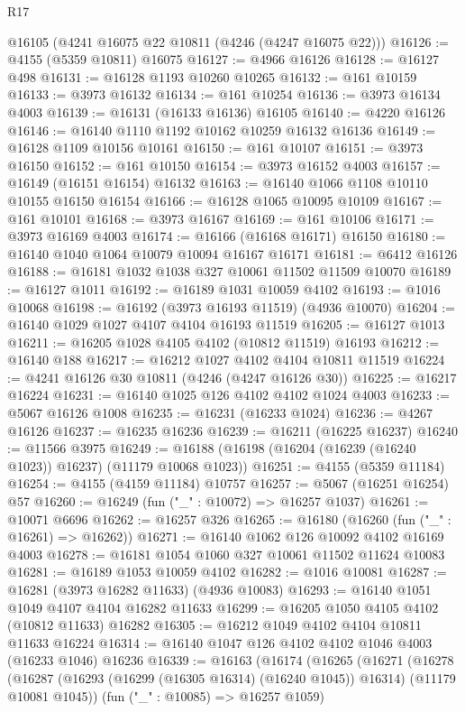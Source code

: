 \begin{lexlean}{R17}
\begin{coremodule}
    @16105
    (@4241 @16075 @22 @10811 (@4246 (@4247 @16075 @22)))
@16126 := @4155 (@5359 @10811) @16075
@16127 := @4966 @16126
@16128 := @16127 @498
@16131 := @16128 @1193 @10260 @10265
@16132 := @161 @10159
@16133 := @3973 @16132
@16134 := @161 @10254
@16136 := @3973 @16134 @4003
@16139 := @16131 (@16133 @16136) @16105
@16140 := @4220 @16126
@16146 := @16140 @1110 @1192 @10162 @10259 @16132 @16136
@16149 := @16128 @1109 @10156 @10161
@16150 := @161 @10107
@16151 := @3973 @16150
@16152 := @161 @10150
@16154 := @3973 @16152 @4003
@16157 := @16149 (@16151 @16154) @16132
@16163 := @16140 @1066 @1108 @10110 @10155 @16150 @16154
@16166 := @16128 @1065 @10095 @10109
@16167 := @161 @10101
@16168 := @3973 @16167
@16169 := @161 @10106
@16171 := @3973 @16169 @4003
@16174 := @16166 (@16168 @16171) @16150
@16180 := @16140 @1040 @1064 @10079 @10094 @16167 @16171
@16181 := @6412 @16126
@16188 := @16181 @1032 @1038 @327 @10061 @11502 @11509 @10070
@16189 := @16127 @1011
@16192 := @16189 @1031 @10059 @4102
@16193 := @1016 @10068
@16198 := @16192 (@3973 @16193 @11519) (@4936 @10070)
@16204 := @16140 @1029 @1027 @4107 @4104 @16193 @11519
@16205 := @16127 @1013
@16211 := @16205 @1028 @4105 @4102 (@10812 @11519) @16193
@16212 := @16140 @188
@16217 := @16212 @1027 @4102 @4104 @10811 @11519
@16224 := @4241 @16126 @30 @10811 (@4246 (@4247 @16126 @30))
@16225 := @16217 @16224
@16231 := @16140 @1025 @126 @4102 @4102 @1024 @4003
@16233 := @5067 @16126 @1008
@16235 := @16231 (@16233 @1024)
@16236 := @4267 @16126
@16237 := @16235 @16236
@16239 := @16211 (@16225 @16237)
@16240 := @11566 @3975
@16249 := @16188 (@16198 (@16204 (@16239 (@16240 @1023)) @16237) (@11179 @10068 @1023))
@16251 := @4155 (@5359 @11184)
@16254 := @4155 (@4159 @11184) @10757
@16257 := @5067 (@16251 @16254) @57
@16260 := @16249 (fun ("_" : @10072) => @16257 @1037)
@16261 := @10071 @6696
@16262 := @16257 @326
@16265 := @16180 (@16260 (fun ("_" : @16261) => @16262))
@16271 := @16140 @1062 @126 @10092 @4102 @16169 @4003
@16278 := @16181 @1054 @1060 @327 @10061 @11502 @11624 @10083
@16281 := @16189 @1053 @10059 @4102
@16282 := @1016 @10081
@16287 := @16281 (@3973 @16282 @11633) (@4936 @10083)
@16293 := @16140 @1051 @1049 @4107 @4104 @16282 @11633
@16299 := @16205 @1050 @4105 @4102 (@10812 @11633) @16282
@16305 := @16212 @1049 @4102 @4104 @10811 @11633 @16224
@16314 := @16140 @1047 @126 @4102 @4102 @1046 @4003 (@16233 @1046) @16236
@16339 := @16163
    (@16174
      (@16265
        (@16271
          (@16278
            (@16287 (@16293 (@16299 (@16305 @16314) (@16240 @1045)) @16314) (@11179 @10081 @1045))
            (fun ("_" : @10085) => @16257 @1059)

\end{coremodule}
\end{lexlean}
